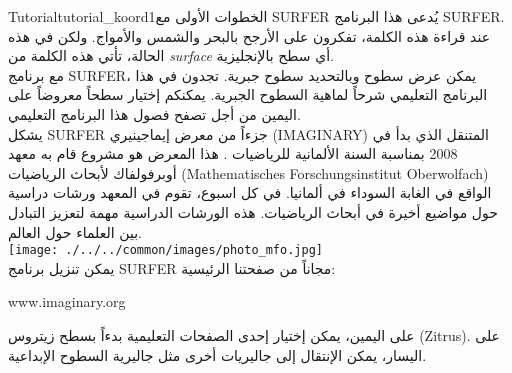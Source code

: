 \begin{surferIntroPage}{Tutorial}{tutorial_koord1}{الخطوات الأولى مع SURFER}
يُدعى هذا البرنامج \textenglish{SURFER}. عند قراءة هذه الكلمة، تفكرون على الأرجح بالبحر والشمس والأمواج. ولكن في هذه الحالة، تأتي هذه الكلمة من \textenglish{\it surface} أي سطح بالإنجليزية.
\\
مع برنامج \textenglish{SURFER}، يمكن عرض سطوح وبالتحديد سطوح جبرية. تجدون في هذا البرنامج التعليمي شرحاً لماهية السطوح الجبرية. يمكنكم إختيار سطحاً معروضاً على اليمين من أجل تصفح فصول هذا البرنامج التعليمي.\\
يشكل \textenglish{SURFER} جزءاً من معرض إيماجينيري
 \textenglish{(IMAGINARY)}
  المتنقل الذي بدأ في 2008 بمناسبة السنة الألمانية للرياضيات . هذا المعرض هو مشروع قام به معهد أوبرفولفاك لأبحاث الرياضيات
\textenglish{(Mathematisches Forschungsinstitut Oberwolfach)}
 الواقع في الغابة السوداء في ألمانيا. في كل اسبوع، تقوم في المعهد ورشات دراسية حول مواضيع أخيرة في أبحاث الرياضيات. هذه الورشات الدراسية مهمة لتعزيز التبادل بين العلماء حول العالم. \\
\vspace{0.2cm} \hspace{3.5cm}\texttt{[image: ./../../common/images/photo\_mfo.jpg]}\\
يمكن تنزيل برنامج \textenglish{SURFER} مجاناً من صفحتنا الرئيسية: \\
\begin{centering}
\textenglish{www.imaginary.org}\\
\end{centering}
 \vspace{0.2cm}
على اليمين، يمكن إختيار إحدى الصفحات التعليمية بدءاً بسطح زيتروس
 \textenglish{(Zitrus)}.
  على اليسار، يمكن الإنتقال إلى جاليريات أخرى مثل جاليرية السطوح الإبداعية.
\end{surferIntroPage}
